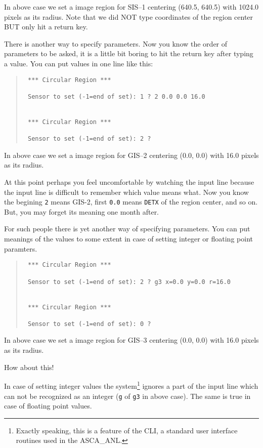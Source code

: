 In above case
we set a image region for SIS--1
centering (640.5, 640.5) with 1024.0 pixels as its radius.
Note that
we did NOT type coordinates of the region center
BUT only hit a return key.

There is another way to specify parameters.
Now you know the order of parameters to be asked,
it is a little bit boring to hit the return key after typing a value.
You can put values in one line like this:

\begin{quote}\baselineskip 3.2mm\begin{verbatim}
 *** Circular Region ***

 Sensor to set (-1=end of set): 1 ? 2 0.0 0.0 16.0


 *** Circular Region ***

 Sensor to set (-1=end of set): 2 ? 
\end{verbatim}\end{quote}

In above case
we set a image region for GIS--2
centering (0.0, 0.0) with 16.0 pixels as its radius.

At this point
perhaps you feel uncomfortable by watching the input line
because the input line is difficult to remember which value means what.
Now you know the begining {\tt 2} means GIS-2,
first {\tt 0.0} means {\tt DETX} of the region center, and so on.
But, you may forget its meaning one month after.

For such people
there is yet another way of specifying parameters.
You can put meanings of the values to some extent
in case of setting integer or floating point paramters.

\begin{quote}\baselineskip 3.2mm\begin{verbatim}
 *** Circular Region ***

 Sensor to set (-1=end of set): 2 ? g3 x=0.0 y=0.0 r=16.0


 *** Circular Region ***

 Sensor to set (-1=end of set): 0 ? 
\end{verbatim}\end{quote}

In above case
we set a image region for GIS--3
centering (0.0, 0.0) with 16.0 pixels as its radius.

How about this!

In case of setting integer values
the system\footnote{
Exactly speaking,
this is a feature of the CLI,
a standard user interface routines used in the ASCA\_ANL.
} ignores
a part of the input line which can not be recognized as an integer
({\tt g} of {\tt g3} in above case).
The same is true in case of floating point values.

